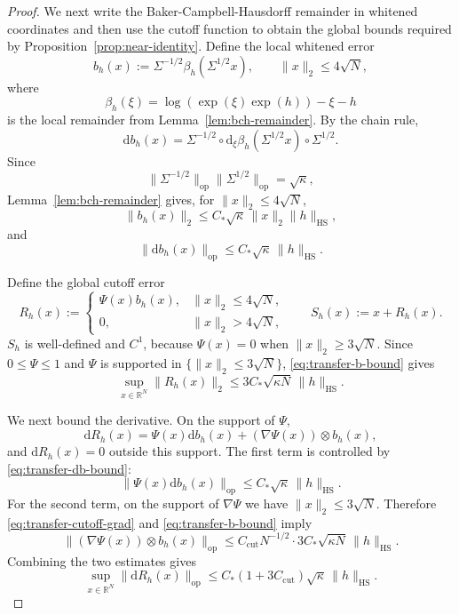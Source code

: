 \documentclass[11pt, reqno]{amsart}
\numberwithin{equation}{section}
\theoremstyle{remark}
\newcommand{\R}{\mathbb{R}}
\newcommand{\1}{\mathbf{1}}
\newcommand{\HS}{\mathrm{HS}}
\newcommand{\op}{\mathrm{op}}
\newcommand{\dd}{\mathrm{d}}
\begin{document}
\begin{proof}
We next write the Baker-Campbell-Hausdorff remainder in whitened coordinates and then use the cutoff function to obtain the global bounds required by Proposition~\ref{prop:near-identity}.
Define the local whitened error
\[
b_h(x):=\Sigma^{-1/2}\beta_h(\Sigma^{1/2}x),
\qquad \|x\|_2\le 4\sqrt N,
\]
where
\[
\beta_h(\xi)=\log(\exp(\xi)\exp(h))-\xi-h
\]
is the local remainder from Lemma~\ref{lem:bch-remainder}. 
By the chain rule,
\[
\dd b_h(x)
=
\Sigma^{-1/2}\circ
\dd_\xi\beta_h(\Sigma^{1/2}x)
\circ \Sigma^{1/2}.
\]
Since
\[
\|\Sigma^{-1/2}\|_{\op}\|\Sigma^{1/2}\|_{\op}
=
\sqrt{\kappa},
\]
Lemma~\ref{lem:bch-remainder} gives, for \(\|x\|_2\le 4\sqrt N\),
\begin{equation}
\label{eq:transfer-b-bound}
\|b_h(x)\|_2
\le
C_\ast\sqrt{\kappa}\,\|x\|_2\|h\|_{\HS},
\end{equation}
and
\begin{equation}
\label{eq:transfer-db-bound}
\|\dd b_h(x)\|_{\op}
\le
C_\ast\sqrt{\kappa}\,\|h\|_{\HS}.
\end{equation}

Define the global cutoff error
\[
R_h(x):=
\begin{cases}
\Psi(x)b_h(x), & \|x\|_2\le 4\sqrt N,\\
0, & \|x\|_2>4\sqrt N,
\end{cases}
\qquad
S_h(x):=x+R_h(x).
\]
$S_{h}$ is well-defined and \(C^1\), because \(\Psi(x)=0\) when
\(\|x\|_2\ge 3\sqrt N\). Since \(0\le \Psi\le 1\) and \(\Psi\) is supported in
\(\{\|x\|_2\le 3\sqrt N\}\), \eqref{eq:transfer-b-bound} gives
\begin{equation}
\label{eq:transfer-R-bound}
\sup_{x\in\R^N}\|R_h(x)\|_2
\le
3C_\ast\sqrt{\kappa N}\,\|h\|_{\HS}.
\end{equation}

We next bound the derivative. On the support of \(\Psi\),
\[
\dd R_h(x)
=
\Psi(x)\dd b_h(x)+(\nabla\Psi(x))\otimes b_h(x),
\]
and \(\dd R_h(x)=0\) outside this support. The first term is controlled by
\eqref{eq:transfer-db-bound}:
\[
\|\Psi(x)\dd b_h(x)\|_{\op}
\le
C_\ast\sqrt{\kappa}\,\|h\|_{\HS}.
\]
For the second term, on the support of \(\nabla\Psi\) we have
\(\|x\|_2\le 3\sqrt N\). Therefore \eqref{eq:transfer-cutoff-grad} and
\eqref{eq:transfer-b-bound} imply
\[
\|(\nabla\Psi(x))\otimes b_h(x)\|_{\op}
\le
C_{\mathrm{cut}}N^{-1/2}
\cdot
3C_\ast\sqrt{\kappa N}\,\|h\|_{\HS}.
\]
Combining the two estimates gives
\begin{equation}
\label{eq:transfer-DR-bound}
\sup_{x\in\R^N}\|\dd R_h(x)\|_{\op}
\le
C_\ast(1+3C_{\mathrm{cut}})\sqrt{\kappa}\,\|h\|_{\HS}.
\end{equation}


\end{proof}
\end{document}
